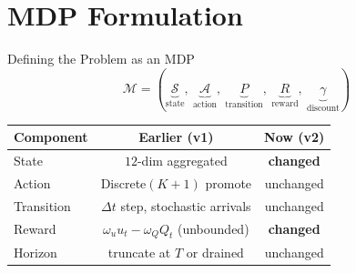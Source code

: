 


\section{MDP Formulation}

\begin{frame}{Defining the Problem as an MDP}
  $$ \mathcal{M} = (\underbrace{\mathcal{S}}_{\text{state}},\ \underbrace{\mathcal{A}}_{\text{action}},\ \underbrace{P}_{\text{transition}},\ \underbrace{R}_{\text{reward}},\ \underbrace{\gamma}_{\text{discount}}) $$

  \vspace{0.6em}
  \begin{center}
  \renewcommand{\arraystretch}{1.25}
  \begin{tabular}{l c c}
    \toprule
    \textbf{Component} & \textbf{Earlier (v1)} & \textbf{Now (v2)} \\
    \midrule
    State      & $12$-dim aggregated   & \textcolor{SoftCoral}{\textbf{changed}} \\
    Action     & Discrete$(K{+}1)$ promote         & unchanged \\
    Transition & $\Delta t$ step, stochastic arrivals & unchanged \\
    Reward     & $\omega_u u_t - \omega_Q Q_t$ (unbounded)   & \textcolor{SoftCoral}{\textbf{changed}} \\
    Horizon    & truncate at $T$ or drained        & unchanged \\
    \bottomrule
  \end{tabular}
  \end{center}

  \vspace{0.3em}
  \centering
\end{frame}

